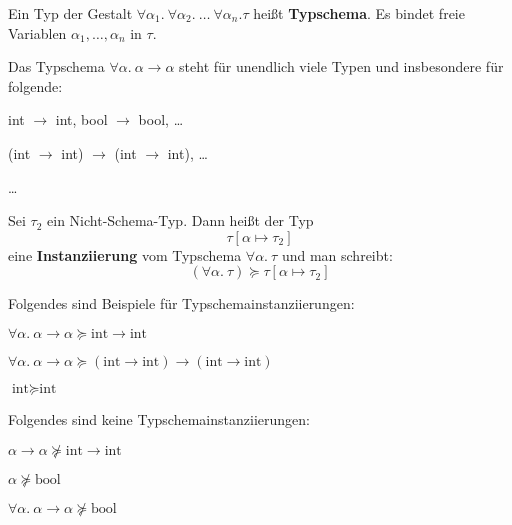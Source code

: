 \begin{definition}[Typschema]%
    Ein Typ der Gestalt $\forall \alpha_1.\ \forall \alpha_2.\ \dots\ \forall \alpha_n. \tau$
    heißt \textbf{Typschema}. Es bindet freie Variablen $\alpha_1, \dots, \alpha_n$
    in $\tau$.
\end{definition}

\begin{beispiel}[Typschema]
    Das Typschema $\forall \alpha.\ \alpha \rightarrow \alpha$ steht für unendlich
    viele Typen und insbesondere für folgende:
    \begin{bspenum}
        \item int $\rightarrow$ int, bool $\rightarrow$ bool, \dots
        \item (int $\rightarrow$ int) $\rightarrow$ (int $\rightarrow$ int), \dots
        \item \dots
    \end{bspenum}
\end{beispiel}

\begin{definition}[Typschemainstanziierung]%
    Sei $\tau_2$ ein Nicht-Schema-Typ. Dann heißt der Typ
    \[\tau[\alpha \mapsto \tau_2]\]
    eine \textbf{Instanziierung} vom Typschema $\forall \alpha.\ \tau$
    und man schreibt:
    \[(\forall \alpha.\ \tau) \succeq \tau [\alpha \mapsto \tau_2]\]
\end{definition}

\begin{beispiel}[Typschemainstanziierung]
    Folgendes sind Beispiele für Typschemainstanziierungen:
    \begin{bspenum}
        \item $\forall \alpha.\ \alpha \rightarrow \alpha \succeq \text{int} \rightarrow \text{int}$
        \item $\forall \alpha.\ \alpha \rightarrow \alpha \succeq (\text{int} \rightarrow \text{int}) \rightarrow (\text{int} \rightarrow \text{int})$
        \item $\text{int} \succeq \text{int}$
    \end{bspenum}

    Folgendes sind keine Typschemainstanziierungen:
    \begin{bspenum}
        \item $\alpha \rightarrow \alpha \nsucceq \text{int} \rightarrow \text{int}$
        \item $\alpha \nsucceq \text{bool}$
        \item $\forall \alpha.\ \alpha \rightarrow \alpha \nsucceq \text{bool}$
    \end{bspenum}
\end{beispiel}


